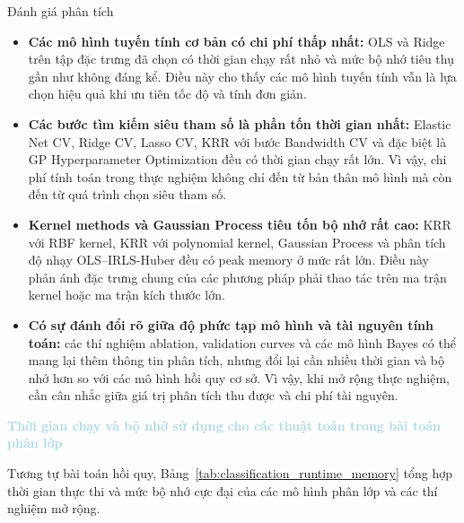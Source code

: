 \begin{warningbox}{Đánh giá phân tích}
\begin{itemize}[labelsep=10pt, leftmargin=1.8cm]
    \item \textbf{Các mô hình tuyến tính cơ bản có chi phí thấp nhất:} OLS và Ridge trên tập đặc trưng đã chọn có thời gian chạy rất nhỏ và mức bộ nhớ tiêu thụ gần như không đáng kể. Điều này cho thấy các mô hình tuyến tính vẫn là lựa chọn hiệu quả khi ưu tiên tốc độ và tính đơn giản.

    \item \textbf{Các bước tìm kiếm siêu tham số là phần tốn thời gian nhất:} Elastic Net CV, Ridge CV, Lasso CV, KRR với bước Bandwidth CV và đặc biệt là GP Hyperparameter Optimization đều có thời gian chạy rất lớn. Vì vậy, chi phí tính toán trong thực nghiệm không chỉ đến từ bản thân mô hình mà còn đến từ quá trình chọn siêu tham số.

    \item \textbf{Kernel methods và Gaussian Process tiêu tốn bộ nhớ rất cao:} KRR với RBF kernel, KRR với polynomial kernel, Gaussian Process và phân tích độ nhạy OLS--IRLS-Huber đều có peak memory ở mức rất lớn. Điều này phản ánh đặc trưng chung của các phương pháp phải thao tác trên ma trận kernel hoặc ma trận kích thước lớn.

    \item \textbf{Có sự đánh đổi rõ giữa độ phức tạp mô hình và tài nguyên tính toán:} các thí nghiệm ablation, validation curves và các mô hình Bayes có thể mang lại thêm thông tin phân tích, nhưng đổi lại cần nhiều thời gian và bộ nhớ hơn so với các mô hình hồi quy cơ sở. Vì vậy, khi mở rộng thực nghiệm, cần cân nhắc giữa giá trị phân tích thu được và chi phí tài nguyên.
\end{itemize}
\end{warningbox}

\noindent\textcolor{lightblue}{\textbf{Thời gian chạy và bộ nhớ sử dụng cho các thuật toán trong bài toán phân lớp}}

Tương tự bài toán hồi quy, Bảng~\ref{tab:classification_runtime_memory} tổng hợp thời gian thực thi và mức bộ nhớ cực đại của các mô hình phân lớp và các thí nghiệm mở rộng.

